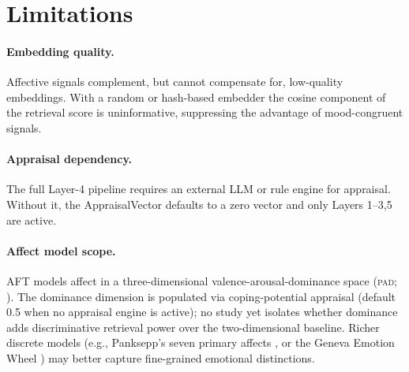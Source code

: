 \documentclass[11pt]{article}
\begin{document}
\section{Limitations}
\label{sec:limitations}

\paragraph{Embedding quality.}
Affective signals complement, but cannot compensate for, low-quality embeddings.
With a random or hash-based embedder the cosine component of the retrieval score
is uninformative, suppressing the advantage of mood-congruent signals.

\paragraph{Appraisal dependency.}
The full Layer-4 pipeline requires an external LLM or rule engine for appraisal.
Without it, the AppraisalVector defaults to a zero vector and only Layers 1--3,5
are active.

\paragraph{Affect model scope.}
AFT models affect in a three-dimensional valence-arousal-dominance space
(\textsc{pad}; \citealp{mehrabian1974approach}). The dominance dimension is
populated via coping-potential appraisal (default 0.5 when no appraisal engine
is active); no study yet isolates whether dominance adds discriminative retrieval
power over the two-dimensional baseline. Richer discrete models
(e.g., Panksepp's seven primary affects \citep{panksepp1998affective}, or the
Geneva Emotion Wheel \citep{scherer2005emotions}) may better capture
fine-grained emotional distinctions.
\end{document}
